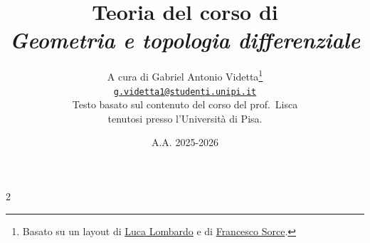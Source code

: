 \documentclass[10pt]{report}
\title{\Huge{Teoria del corso di \\ \textit{Geometria e topologia differenziale}}}
\date{A.A. 2025-2026}
\author{A cura di Gabriel Antonio Videtta\footnote{Basato su un layout di \underline{Luca Lombardo} e di \underline{Francesco Sorce}.} \\ \href{mailto:g.videtta1@studenti.unipi.it}{\texttt{g.videtta1@studenti.unipi.it}} \\[0.3in] Testo basato sul contenuto del corso del prof.~Lisca \\ tenutosi presso l'Università di Pisa.}
\begin{document}
\maketitle

\begin{multicols*}{2}
    \tableofcontents
\end{multicols*}

\newpage






\end{document}
